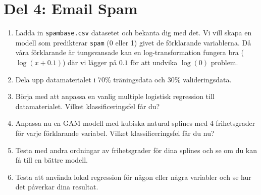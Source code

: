 \documentclass[a4paper]{article}
\begin{document}
\section*{Del 4: Email Spam}
    \begin{enumerate}
        \item Ladda in \texttt{spambase.csv} datasetet och bekanta dig med det. Vi vill skapa en modell som predikterar \texttt{spam} (0 eller 1) givet de förklarande variablerna. Då våra förklarande är tungsvansade kan en log-transformation fungera bra ($\log(x + 0.1)$) där vi lägger på $0.1$ för att undvika $\log(0)$ problem.
        \item Dela upp datamaterialet i 70\% träningsdata och 30\% valideringsdata.
        \item Börja med att anpassa en vanlig multiple logistisk regression till datamaterialet. Vilket klassificeringsfel får du?
        \item Anpassa nu en GAM modell med kubiska natural splines med 4 frihetsgrader för varje förklarande variabel. Vilket klassificeringsfel får du nu?
        \item Testa med andra ordningar av frihetsgrader för dina splines och se om du kan få till en bättre modell.
        \item Testa att använda lokal regression för någon eller några variabler och se hur det påverkar dina resultat.
    \end{enumerate}
\end{document}
